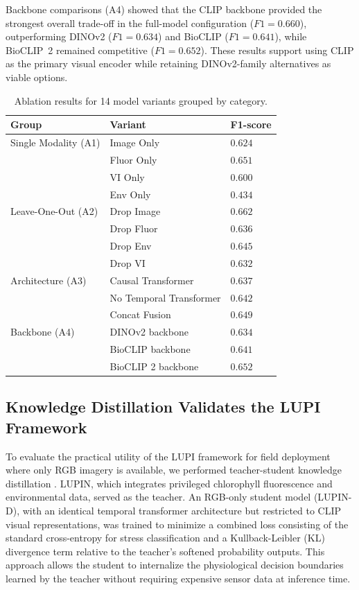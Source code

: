 \documentclass[a4paper,fleqn]{cas-dc}
\begin{document}
Backbone comparisons (A4) showed that the CLIP backbone provided the strongest overall trade-off in the full-model configuration ($F1=0.660$), outperforming DINOv2 ($F1=0.634$) and BioCLIP ($F1=0.641$), while BioCLIP~2 remained competitive ($F1=0.652$). These results support using CLIP as the primary visual encoder while retaining DINOv2-family alternatives as viable options.

\begin{table}[width=.9\linewidth,pos=ht]
\caption{Ablation results for 14 model variants grouped by category.}\label{tab:ablation}
\begin{tabular*}{\tblwidth}{@{}LLL@{}}
\toprule
Group & Variant & F1-score \\
\midrule
Single Modality (A1) & Image Only & $0.624$ \\
& Fluor Only & $0.651$ \\
& VI Only & $0.600$ \\
& Env Only & $0.434$ \\
\midrule
Leave-One-Out (A2)   & Drop Image & $0.662$ \\
& Drop Fluor & $0.636$ \\
& Drop Env & $0.645$ \\
& Drop VI & $0.632$ \\
\midrule
Architecture (A3) & Causal Transformer & $0.637$ \\
& No Temporal Transformer & $0.642$ \\
& Concat Fusion & $0.649$ \\
\midrule
Backbone (A4) & DINOv2 backbone & $0.634$ \\
& BioCLIP backbone & $0.641$ \\
& BioCLIP 2 backbone & $0.652$ \\
\bottomrule
\end{tabular*}
\end{table}

\subsection{Knowledge Distillation Validates the LUPI Framework}\label{sec:results:distillation}

To evaluate the practical utility of the LUPI framework for field deployment where only RGB imagery is available, we performed teacher-student knowledge distillation \citep{hintonDistillingKnowledgeNeural2015}. LUPIN, which integrates privileged chlorophyll fluorescence and environmental data, served as the teacher. An RGB-only student model (LUPIN-D), with an identical temporal transformer architecture but restricted to CLIP visual representations, was trained to minimize a combined loss consisting of the standard cross-entropy for stress classification and a Kullback-Leibler (KL) divergence term relative to the teacher's softened probability outputs. This approach allows the student to internalize the physiological decision boundaries learned by the teacher without requiring expensive sensor data at inference time.
\end{document}
